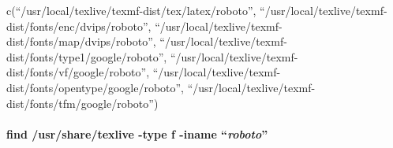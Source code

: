 \documentclass[
]{article}
\newenvironment{Shaded}{\begin{snugshade}}{\end{snugshade}}
\newcommand{\AttributeTok}[1]{\textcolor[rgb]{0.13,0.29,0.53}{#1}}
\newcommand{\ConstantTok}[1]{\textcolor[rgb]{0.56,0.35,0.01}{#1}}
\newcommand{\ControlFlowTok}[1]{\textcolor[rgb]{0.13,0.29,0.53}{\textbf{#1}}}
\newcommand{\DecValTok}[1]{\textcolor[rgb]{0.00,0.00,0.81}{#1}}
\newcommand{\FunctionTok}[1]{\textcolor[rgb]{0.13,0.29,0.53}{\textbf{#1}}}
\newcommand{\NormalTok}[1]{#1}
\newcommand{\SpecialCharTok}[1]{\textcolor[rgb]{0.81,0.36,0.00}{\textbf{#1}}}
\newcommand{\StringTok}[1]{\textcolor[rgb]{0.31,0.60,0.02}{#1}}
\begin{document}
\begin{Shaded}
\end{Shaded}

c(``/usr/local/texlive/texmf-dist/tex/latex/roboto'',
``/usr/local/texlive/texmf-dist/fonts/enc/dvips/roboto'',
``/usr/local/texlive/texmf-dist/fonts/map/dvips/roboto'',
``/usr/local/texlive/texmf-dist/fonts/type1/google/roboto'',
``/usr/local/texlive/texmf-dist/fonts/vf/google/roboto'',
``/usr/local/texlive/texmf-dist/fonts/opentype/google/roboto'',
``/usr/local/texlive/texmf-dist/fonts/tfm/google/roboto'')

\hypertarget{find-usrsharetexlive--type-f--iname-roboto}{%
\paragraph{\texorpdfstring{find /usr/share/texlive -type f -iname
``\emph{roboto}''}{find /usr/share/texlive -type f -iname ``roboto''}}\label{find-usrsharetexlive--type-f--iname-roboto}}
\end{document}
